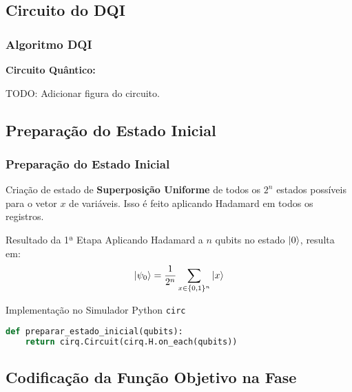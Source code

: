 \documentclass[aspectratio=169]{beamer}
\begin{document}
\subsection{Circuito do DQI}
\begin{frame}
  \frametitle{Algoritmo DQI}

  \textbf{Circuito Quântico:}

  TODO: Adicionar figura do circuito.
    
\end{frame}

\subsection{Preparação do Estado Inicial}

\begin{frame}[fragile]
  \frametitle{Preparação do Estado Inicial}

  Criação de estado de \textbf{Superposição Uniforme} de todos os $2^n$ estados possíveis para o vetor $x$ de variáveis.
  Isso é feito aplicando Hadamard em todos os registros.

  \vfill

  \begin{block}{Resultado da 1ª Etapa}
  Aplicando Hadamard a $n$ qubits no estado $\ket{0}$, resulta em:
  \[
    \ket{\psi_0}=\frac{1}{2^n} \sum_{x\in\{0,1\}^n}\ket{x}
  \]
  \end{block}

  \begin{block}{Implementação no Simulador Python \lstinline|circ|}
  \begin{lstlisting}[language=Python, frame=single, basicstyle=\tiny]
def preparar_estado_inicial(qubits):
    return cirq.Circuit(cirq.H.on_each(qubits))
  \end{lstlisting}
  \end{block}

\end{frame}

\subsection{Codificação da Função Objetivo na Fase}
\end{document}
